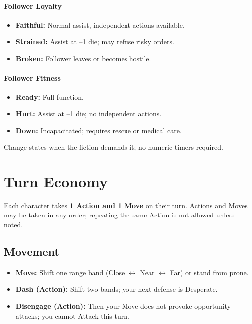 \paragraph{Follower Loyalty}
\begin{itemize}
    \item \textbf{Faithful:} Normal assist, independent actions available.
    \item \textbf{Strained:} Assist at --1 die; may refuse risky orders.
    \item \textbf{Broken:} Follower leaves or becomes hostile.
\end{itemize}

\paragraph{Follower Fitness}
\begin{itemize}
    \item \textbf{Ready:} Full function.
    \item \textbf{Hurt:} Assist at --1 die; no independent actions.
    \item \textbf{Down:} Incapacitated; requires rescue or medical care.
\end{itemize}
Change states when the fiction demands it; no numeric timers required.

\section{Turn Economy}\label{sec:turn_economy}

Each character takes \textbf{1 Action and 1 Move} on their turn. Actions and
Moves may be taken in any order; repeating the same Action is not allowed unless
noted.

\subsection{Movement}
\begin{itemize}
    \item \textbf{Move:} Shift one range band (Close $\leftrightarrow$ Near $\leftrightarrow$ Far) or stand from prone.
    \item \textbf{Dash (Action):} Shift two bands; your next defense is Desperate.
    \item \textbf{Disengage (Action):} Then your Move does not provoke
        opportunity attacks; you cannot Attack this turn.
\end{itemize}

